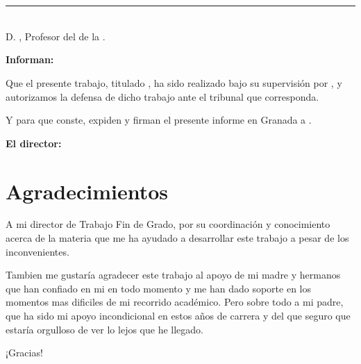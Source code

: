 \chapter*{}

\thispagestyle{empty}

\noindent\rule[-1ex]{\textwidth}{2pt}\\[4.5ex]

D. \textbf{\myProf}, Profesor del \myDepartment de la \myUni.

\vspace{0.5cm}

\textbf{Informan:}

\vspace{0.5cm}

Que el presente trabajo, titulado \textit{\textbf{\myTitle}}, ha sido realizado bajo su supervisión por \textbf{\myName}, y autorizamos la defensa de dicho trabajo ante el tribunal
que corresponda.

\vspace{0.5cm}

Y para que conste, expiden y firman el presente informe en Granada a \myTime.

\vspace{1cm}

\textbf{El director:}

\vspace{5cm}

\noindent \textbf{\myProf}


\thispagestyle{empty}

\cleardoublepage

\chapter*{Agradecimientos}

\vspace{1cm}

A mi director de Trabajo Fin de Grado, \myProf  por su coordinación y conocimiento acerca de la materia que me ha ayudado a 
desarrollar este trabajo a pesar de los inconvenientes.

Tambien me gustaría agradecer este trabajo al apoyo de mi madre y hermanos que han confiado en mi en todo momento y me han dado 
soporte en los momentos mas dificiles de mi recorrido académico. Pero sobre todo a mi padre, que ha sido mi apoyo incondicional en 
estos años de carrera y del que seguro que estaría orgulloso de ver lo lejos que he llegado.

¡Gracias!
